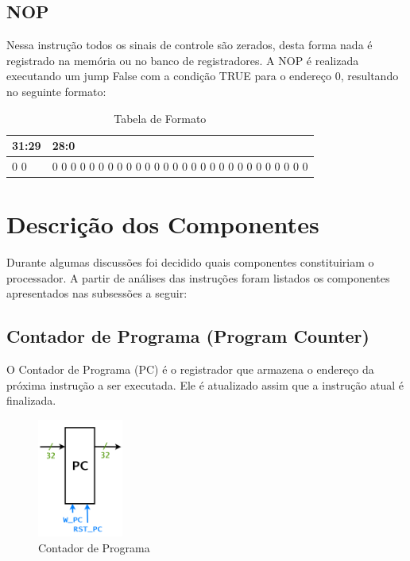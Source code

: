 \documentclass{report}
\begin{document}
\subsection{NOP}
Nessa instrução todos os sinais de controle são zerados, desta forma nada é registrado na memória ou no banco de registradores. A NOP é realizada executando um jump False com a condição TRUE para o endereço 0, resultando no seguinte formato:

\FloatBarrier
\begin{table}[H]
  \begin{center}
    \begin{tabular}[pos]{|>{\centering\arraybackslash}m{37pt}|>{\centering\arraybackslash}m{365pt}|} \hline
    \cellcolor[gray]{0.9}\textbf{31:29} & \cellcolor[gray]{0.9}\textbf{28:0} \\ \hline
        0 0 0       &  0 0 0 0 0 0 0 0 0 0 0 0 0 0 0 0 0 0 0 0 0 0 0 0 0 0 0 0 0 \\ \hline
    \end{tabular}
    \caption{Tabela de Formato}
  \end{center}
\end{table}  

\newpage
\section{Descrição dos Componentes}
Durante algumas discussões foi decidido quais  componentes constituiriam o processador. A partir de análises das instruções foram listados os componentes apresentados nas subsessões a seguir:
\subsection{Contador de Programa (Program Counter)}
O Contador de Programa (PC) é o registrador que armazena o endereço da próxima instrução a ser executada. Ele é atualizado assim que a instrução atual é finalizada.
\begin{figure}[H]
\centering
\includegraphics[width=0.25\textwidth]{./pictures/PC.PNG}
\caption{Contador de Programa}
\end{figure}
\end{document}

